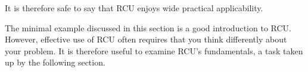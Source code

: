 It is therefore safe to say that RCU enjoys wide practical applicability.

The minimal example discussed in this section is a good introduction to RCU.
However, effective use of RCU often requires that you think differently
about your problem.
It is therefore useful to examine RCU's fundamentals, a task taken up
by the following section.
